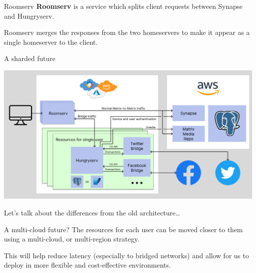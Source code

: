 \documentclass{beeper}
\begin{document}
\begin{frame}{Roomserv}
    \textbf{Roomserv} is a service which splits client requests between Synapse
    and Hungryserv.

    Roomserv merges the responses from the two homeservers to make it appear as
    a single homeserver to the client.
\end{frame}

\begin{frame}{A sharded future}
    \centerline{\includegraphics[width=1.15\textwidth]{images/new-architecture}}

    Let's talk about the differences from the old architecture\ldots
\end{frame}





\begin{frame}{A multi-cloud future?}
    The resources for each user can be moved closer to them using a multi-cloud,
    or multi-region strategy.

    This will help reduce latency (especially to bridged networks) and allow for
    us to deploy in more flexible and cost-effective environments.
\end{frame}
\end{document}
